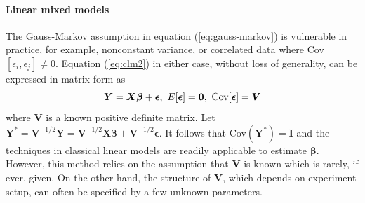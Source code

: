 \paragraph{Linear mixed models}\label{para:lmm}
The Gauss-Markov assumption in equation (\ref{eq:gauss-markov}) is vulnerable in practice, for 
example,
nonconstant variance, or correlated data where Cov$[\epsilon_i, \epsilon_j]\neq 0$.
Equation (\ref{eq:clm2}) in either case, without loss of generality, can be expressed in matrix
form as
\begin{equation}\label{eq:clm3}
	\bm Y = \bm {X\beta} + \bm \epsilon, ~ E[\bm \epsilon] = \bm 0, ~\text{Cov}[\bm\epsilon] = \bm V
\end{equation}
where $\bm V$ is a known positive definite matrix. Let $\bm Y^{\ast} = \bm V^{-1/2}\bm Y = \bm
V^{-1/2}\bm {X\beta} + \bm V^{-1/2}\bm \epsilon$. It follows that Cov$(\bm Y^{\ast})= \bm I$ and the
techniques in classical linear models are readily applicable to estimate $\bm \beta$. However, this
method relies on the assumption that $\bm V$ is known which is rarely, if ever, given. On the other
hand, the structure of $\bm V$, which depends on experiment setup, can often be specified by a few
unknown parameters. 

